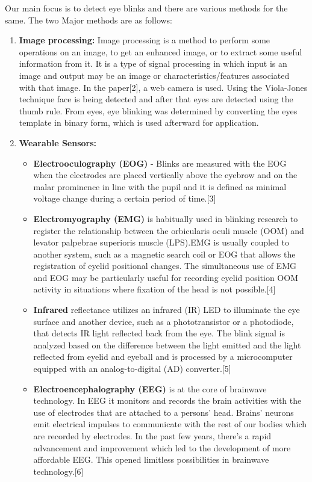 Our main focus is to detect eye blinks and there are various methods for the same. The two Major methods are as follows:
\begin{enumerate}
\item \textbf{Image processing: }
Image processing is a method to perform some operations on an image, to get an enhanced image, or to extract some useful information from it. It is a type of signal processing in which input is an image and output may be an image or characteristics/features associated with that image. In the paper[2], a web camera is used. Using the Viola-Jones technique face is being detected and after that eyes are detected using the thumb rule. From eyes, eye blinking was determined by converting the eyes template in binary form, which is used afterward for application.
\item \textbf{Wearable Sensors: }
\begin{itemize}
\item \textbf{Electrooculography (EOG)} - Blinks are measured with the EOG when the electrodes are placed vertically above the eyebrow and on the malar prominence in line with the pupil and it is defined as minimal voltage change during a certain period of time.[3]
\item \textbf{Electromyography (EMG)} is habitually used in blinking research to register the relationship between the orbicularis oculi muscle (OOM) and levator palpebrae superioris muscle (LPS).EMG is usually coupled to another system, such as a magnetic search coil or EOG that allows the registration of eyelid positional changes. The simultaneous use of EMG and EOG may be particularly useful for recording eyelid position OOM activity in situations where fixation of the head is not possible.[4]
\item \textbf{Infrared} reflectance utilizes an infrared (IR) LED to illuminate the eye surface and another device, such as a phototransistor or a photodiode, that detects IR light reflected back from the eye. The blink signal is analyzed based on the difference between the light emitted and the light reflected from eyelid and eyeball and is processed by a microcomputer equipped with an analog-to-digital (AD) converter.[5]
\item \textbf{Electroencephalography (EEG)} is at the core of brainwave technology. In EEG it monitors and records the brain activities with the use of electrodes that are attached to a persons’ head. Brains’ neurons emit electrical impulses to communicate with the rest of our bodies which are recorded by electrodes. In the past few years, there’s a rapid advancement and improvement which led to the development of more affordable EEG. This opened limitless possibilities in brainwave technology.[6]
\end{itemize}
\end{enumerate}

